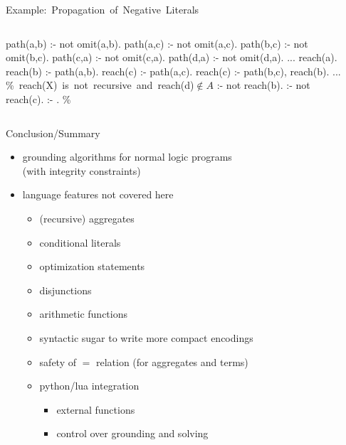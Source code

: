 \begin{frame}[fragile]{\mbox{Example: Propagation of Negative Literals}}
  \vspace{.1cm}
  \begin{columns}
    \begin{column}{0.45\textwidth}
    \begin{minipage}{.4\textwidth}
      \begin{semiverbatim}
path(a,b) :- not omit(a,b).
path(a,c) :- not omit(a,c).
path(b,c) :- not omit(b,c).
path(c,a) :- not omit(c,a).
path(d,a) :- not omit(d,a).
...
\alert{reach(a)}.
\alert{reach(b)} :- path(a,b).
\alert{reach(c)} :- path(a,c).
\alert{reach(c)} :- path(b,c), reach(b).
...
\mbox{{\color{comment}\% reach(X) is not recursive and reach(d)\({}\not\in{}A\)}}
:- not reach(b).
:- not reach(c).
:- . \color{comment}\% 
      \end{semiverbatim}
    \end{minipage}
    \end{column}
    \begin{column}[t]{0.45\textwidth}
      \centering
      \Graph[draw=none]
    \end{column}
  \end{columns}
\end{frame}

\begin{frame}{Conclusion/Summary}
  \vfill
  \begin{itemize}
    \item grounding algorithms for normal logic programs\\(with integrity constraints)
    \item language features not covered here
      \begin{itemize}
        \item (recursive) aggregates
        \item conditional literals
        \item optimization statements
        \item disjunctions
        \item arithmetic functions
        \item syntactic sugar to write more compact encodings
        \item safety of \(=\) relation (for aggregates and terms)
        \item python/lua integration
          \begin{itemize}
            \item external functions
            \item control over grounding and solving
          \end{itemize}
      \end{itemize}
  \end{itemize}
\end{frame}

